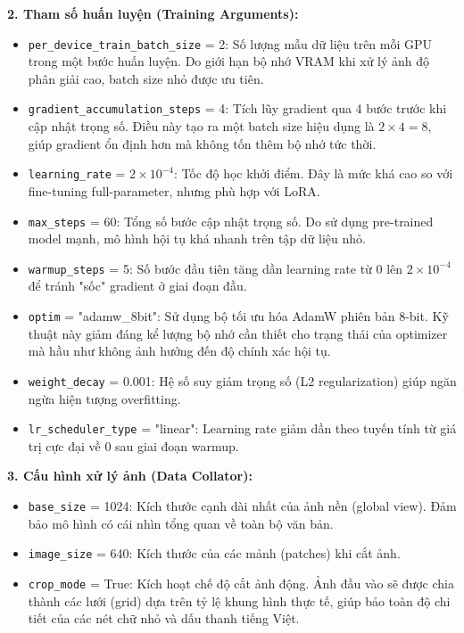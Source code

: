 \textbf{2. Tham số huấn luyện (Training Arguments):}
\begin{itemize}
    \item \texttt{per\_device\_train\_batch\_size} = 2: Số lượng mẫu dữ liệu trên mỗi GPU trong một bước huấn luyện. Do giới hạn bộ nhớ VRAM khi xử lý ảnh độ phân giải cao, batch size nhỏ được ưu tiên.
    \item \texttt{gradient\_accumulation\_steps} = 4: Tích lũy gradient qua 4 bước trước khi cập nhật trọng số. Điều này tạo ra một batch size hiệu dụng là $2 \times 4 = 8$, giúp gradient ổn định hơn mà không tốn thêm bộ nhớ tức thời.
    \item \texttt{learning\_rate} = $2 \times 10^{-4}$: Tốc độ học khởi điểm. Đây là mức khá cao so với fine-tuning full-parameter, nhưng phù hợp với LoRA.
    \item \texttt{max\_steps} = 60: Tổng số bước cập nhật trọng số. Do sử dụng pre-trained model mạnh, mô hình hội tụ khá nhanh trên tập dữ liệu nhỏ.
    \item \texttt{warmup\_steps} = 5: Số bước đầu tiên tăng dần learning rate từ 0 lên $2 \times 10^{-4}$ để tránh "sốc" gradient ở giai đoạn đầu.
    \item \texttt{optim} = "adamw\_8bit": Sử dụng bộ tối ưu hóa AdamW phiên bản 8-bit. Kỹ thuật này giảm đáng kể lượng bộ nhớ cần thiết cho trạng thái của optimizer mà hầu như không ảnh hưởng đến độ chính xác hội tụ.
    \item \texttt{weight\_decay} = 0.001: Hệ số suy giảm trọng số (L2 regularization) giúp ngăn ngừa hiện tượng overfitting.
    \item \texttt{lr\_scheduler\_type} = "linear": Learning rate giảm dần theo tuyến tính từ giá trị cực đại về 0 sau giai đoạn warmup.
\end{itemize}

\textbf{3. Cấu hình xử lý ảnh (Data Collator):}
\begin{itemize}
    \item \texttt{base\_size} = 1024: Kích thước cạnh dài nhất của ảnh nền (global view). Đảm bảo mô hình có cái nhìn tổng quan về toàn bộ văn bản.
    \item \texttt{image\_size} = 640: Kích thước của các mảnh (patches) khi cắt ảnh.
    \item \texttt{crop\_mode} = True: Kích hoạt chế độ cắt ảnh động. Ảnh đầu vào sẽ được chia thành các lưới (grid) dựa trên tỷ lệ khung hình thực tế, giúp bảo toàn độ chi tiết của các nét chữ nhỏ và dấu thanh tiếng Việt.
\end{itemize}
